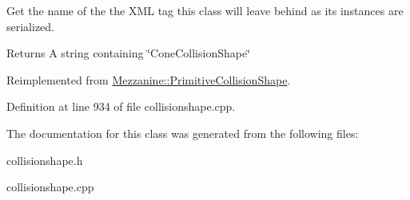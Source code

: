 Get the name of the the XML tag this class will leave behind as its instances are serialized. 

\begin{DoxyReturn}{Returns}
A string containing \char`\"{}ConeCollisionShape\char`\"{} 
\end{DoxyReturn}


Reimplemented from \hyperlink{classMezzanine_1_1PrimitiveCollisionShape_a19bb44a705ff86606834feb2783500e5}{Mezzanine::PrimitiveCollisionShape}.



Definition at line 934 of file collisionshape.cpp.



The documentation for this class was generated from the following files:\begin{DoxyCompactItemize}
\item 
collisionshape.h\item 
collisionshape.cpp\end{DoxyCompactItemize}
